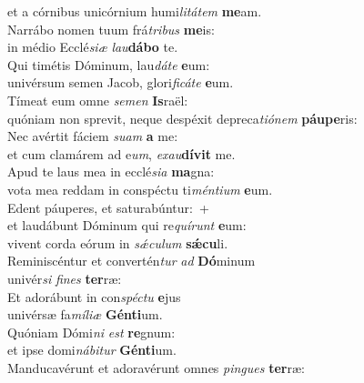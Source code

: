 \evenverse et a córnibus unicórnium humi\textit{li}\textit{tá}\textit{tem} \textbf{me}am.\\
\oddverse Narrábo nomen tuum frá\textit{tri}\textit{bus} \textbf{me}is:~\*\\
\oddverse in médio Ecclé\textit{si}\textit{æ} \textit{lau}\textbf{dá}\textbf{bo} te.\\
\evenverse Qui timétis Dóminum, lau\textit{dá}\textit{te} \textbf{e}um:~\*\\
\evenverse univérsum semen Jacob, glori\textit{fi}\textit{cá}\textit{te} \textbf{e}um.\\
\oddverse Tímeat eum omne \textit{se}\textit{men} \textbf{Is}raël:~\*\\
\oddverse quóniam non sprevit, neque despéxit depreca\textit{ti}\textit{ó}\textit{nem} \textbf{páu}\textbf{pe}ris:\\
\evenverse Nec avértit fáciem \textit{su}\textit{am} \textbf{a} me:~\*\\
\evenverse et cum clamárem ad e\textit{um}, \textit{e}\textit{xau}\textbf{dí}\textbf{vit} me.\\
\oddverse Apud te laus mea in ecclé\textit{si}\textit{a} \textbf{ma}gna:~\*\\
\oddverse vota mea reddam in conspéctu ti\textit{mén}\textit{ti}\textit{um} \textbf{e}um.\\
\evenverse Edent páuperes, et saturabúntur:~+\\
\evenverse  et laudábunt Dóminum qui re\textit{quí}\textit{runt} \textbf{e}um:~\*\\
\evenverse vivent corda eórum in \textit{sǽ}\textit{cu}\textit{lum} \textbf{sǽ}\textbf{cu}li.\\
\oddverse Reminiscéntur et convertén\textit{tur} \textit{ad} \textbf{Dó}minum~\*\\
\oddverse univér\textit{si} \textit{fi}\textit{nes} \textbf{ter}ræ:\\
\evenverse Et adorábunt in con\textit{spé}\textit{ctu} \textbf{e}jus~\*\\
\evenverse univérsæ fa\textit{mí}\textit{li}\textit{æ} \textbf{Gén}\textbf{ti}um.\\
\oddverse Quóniam Dómi\textit{ni} \textit{est} \textbf{re}gnum:~\*\\
\oddverse et ipse domi\textit{ná}\textit{bi}\textit{tur} \textbf{Gén}\textbf{ti}um.\\
\evenverse Manducavérunt et adoravérunt omnes \textit{pin}\textit{gues} \textbf{ter}ræ:~\*\\

